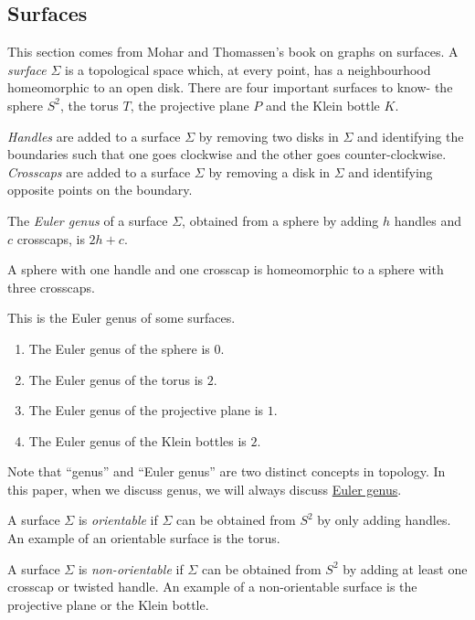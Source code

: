 \subsection{Surfaces}

This section comes from Mohar and Thomassen's\cite{moharGraphsSurfaces2001} book on graphs on surfaces. A \textit{surface} \(\Sigma\) is a topological space which, at every point, has a neighbourhood homeomorphic to an open disk. There are four important surfaces to know- the sphere \(S^2\), the torus \(T\), the projective plane \(P\) and the Klein bottle $K$. 

\textit{Handles} are added to a surface \(\Sigma\) by removing two disks in \(\Sigma\) and identifying the boundaries such that one goes clockwise and the other goes counter-clockwise. \textit{Crosscaps} are added to a surface $\Sigma$ by removing a disk in \(\Sigma\) and identifying opposite points on the boundary. 
\par
\begin{definition}
	The \textit{Euler genus} of a surface \(\Sigma\), obtained from a sphere by adding \(h\) handles and \(c\) crosscaps, is \(2h + c\).
\end{definition}
A sphere with one handle and one crosscap is homeomorphic to a sphere with three crosscaps. 

\begin{example}
	This is the Euler genus of some surfaces.
	\begin{enumerate}
		\item The Euler genus of the sphere is \(0\).
		\item The Euler genus of the torus is \(2\).
		\item The Euler genus of the projective plane is \(1\). 
		\item The Euler genus of the Klein bottles is \(2\). 
	\end{enumerate}
\end{example}

Note that ``genus'' and ``Euler genus'' are two distinct concepts in topology. In this paper, when we discuss genus, we will always discuss \underline{Euler genus}.

A surface \(\Sigma\) is \textit{orientable} if \(\Sigma\) can be obtained from \(S^2\) by only adding handles. An example of an orientable surface is the torus.

A surface \(\Sigma\) is \textit{non-orientable} if \(\Sigma\) can be obtained from \(S^2\) by adding at least one crosscap or twisted handle. An example of a non-orientable surface is the projective plane or the Klein bottle. 

